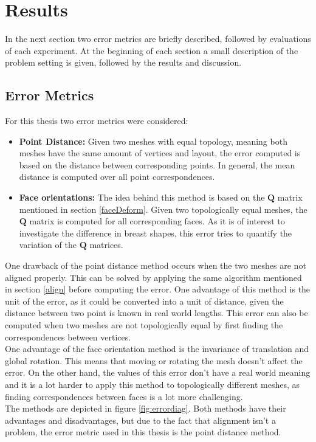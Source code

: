 \chapter{Results}
In the next section two error metrics are briefly described, followed by evaluations of each experiment. At the beginning of each section a small description of the problem setting is given, followed by the results and discussion.

\section{Error Metrics}
\label{Emetrics}
For this thesis two error metrics were considered:
\begin{itemize}
  \item \textbf{Point Distance:} Given two meshes with equal topology, meaning both meshes have the same amount of vertices and layout, the error computed is based on the distance between corresponding points. In general, the mean distance is computed over all point correspondences.
  \item \textbf{Face orientations:} The idea behind this method is based on the $\mathbf{Q}$ matrix mentioned in section \ref{faceDeform}. Given two topologically equal meshes, the $\mathbf{Q}$ matrix is computed for all corresponding faces. As it is of interest to investigate the difference in breast shapes, this error tries to quantify the variation of the $\mathbf{Q}$ matrices.
\end{itemize}

One drawback of the point distance method occurs when the two meshes are not aligned properly. This can be solved by applying the same algorithm mentioned in section \ref{align} before computing the error. One advantage of this method is the unit of the error, as it could be converted into a unit of distance, given the distance between two point is known in real world lengths. This error can also be computed when two meshes are not topologically equal by first finding the correspondences between vertices.\\
One advantage of the face orientation method is the invariance of translation and global rotation. This means that moving or rotating the mesh doesn't affect the error. On the other hand, the values of this error don't have a real world meaning and it is a lot harder to apply this method to topologically different meshes, as finding correspondences between faces is a lot more challenging.\\
The methods are depicted in figure \ref{fig:errordiag}. Both methods have their advantages and disadvantages, but due to the fact that alignment isn't a problem, the error metric used in this thesis is the point distance method.

